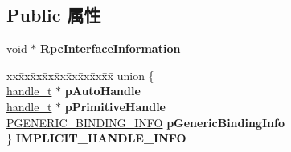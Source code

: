 \subsection*{Public 属性}
\begin{DoxyCompactItemize}
\item 
\mbox{\label{struct___m_i_d_l___s_t_u_b___d_e_s_c_a2a27ae2992a8542e3df6a649c585f14e}} 
\hyperlink{interfacevoid}{void} $\ast$ {\bfseries Rpc\+Interface\+Information}
\item 
\mbox{\label{struct___m_i_d_l___s_t_u_b___d_e_s_c_a63e8725ceae05b32b048cc3b25bd225d}} 
\begin{tabbing}
xx\=xx\=xx\=xx\=xx\=xx\=xx\=xx\=xx\=\kill
union \{\\
\>\hyperlink{interfacevoid}{handle\_t} $\ast$ {\bfseries pAutoHandle}\\
\>\hyperlink{interfacevoid}{handle\_t} $\ast$ {\bfseries pPrimitiveHandle}\\
\>\hyperlink{struct_____g_e_n_e_r_i_c___b_i_n_d_i_n_g___i_n_f_o}{PGENERIC\_BINDING\_INFO} {\bfseries pGenericBindingInfo}\\
\} {\bfseries IMPLICIT\_HANDLE\_INFO}\\


\end{tabbing}
\end{DoxyCompactItemize}

